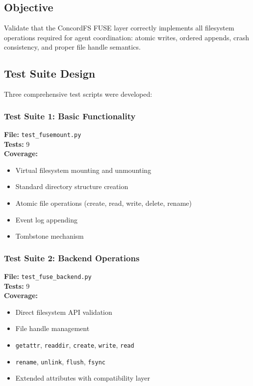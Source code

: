 \documentclass[11pt]{article}
\begin{document}
\subsection{Objective}

Validate that the ConcordFS FUSE layer correctly implements all filesystem operations required for agent coordination: atomic writes, ordered appends, crash consistency, and proper file handle semantics.

\subsection{Test Suite Design}

Three comprehensive test scripts were developed:

\subsubsection{Test Suite 1: Basic Functionality}

\textbf{File:} \texttt{test\_fusemount.py}\\
\textbf{Tests:} 9\\
\textbf{Coverage:}
\begin{itemize}
\item Virtual filesystem mounting and unmounting
\item Standard directory structure creation
\item Atomic file operations (create, read, write, delete, rename)
\item Event log appending
\item Tombstone mechanism
\end{itemize}

\subsubsection{Test Suite 2: Backend Operations}

\textbf{File:} \texttt{test\_fuse\_backend.py}\\
\textbf{Tests:} 9\\
\textbf{Coverage:}
\begin{itemize}
\item Direct filesystem API validation
\item File handle management
\item \texttt{getattr}, \texttt{readdir}, \texttt{create}, \texttt{write}, \texttt{read}
\item \texttt{rename}, \texttt{unlink}, \texttt{flush}, \texttt{fsync}
\item Extended attributes with compatibility layer
\end{itemize}
\end{document}
